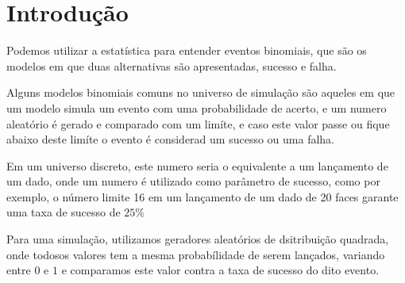 \chapter{Introdu\c{c}\~{a}o}
Podemos utilizar a estat\'{i}stica para entender eventos binomiais, que s\~{a}o os modelos
em que duas alternativas s\~{a}o apresentadas, sucesso e falha.

Alguns modelos binomiais comuns no universo de simula\c{c}\~{a}o
s\~{a}o aqueles em que um modelo simula um evento com uma probabilidade de acerto,
e um numero aleat\'{o}rio \'{e} gerado e comparado com um lim\'{i}te, e caso este valor passe ou
fique abaixo deste lim\'{i}te o evento \'{e} considerad um sucesso ou uma falha.

Em um universo discreto, este numero seria o equivalente a um lan\c{c}amento de um dado,
onde um numero \'{e} utilizado como par\^{a}metro de sucesso, como por exemplo, o número limite 16
em um lan\c{c}amento de um dado de 20 faces garante uma taxa de sucesso de $25\%$

Para uma simula\c{c}ão, utilizamos geradores aleatórios de dsitribui\c{c}ão quadrada, onde
todosos valores tem a mesma probabílidade de serem lan\c{c}ados, variando entre $0$ e $1$
e comparamos este valor contra a taxa de sucesso do dito evento.
